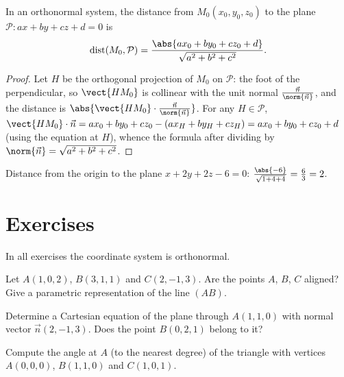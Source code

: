 \begin{proposition}\label{prop:tle:space:distance}
In an orthonormal system, the distance from $M_0(x_0, y_0, z_0)$ to the
plane $\mathcal P : ax + by + cz + d = 0$ is
\[
\operatorname{dist}(M_0, \mathcal P)
= \frac{\abs{ax_0 + by_0 + cz_0 + d}}{\sqrt{a^2 + b^2 + c^2}}.
\]
\end{proposition}

\begin{proof}
Let $H$ be the orthogonal projection of $M_0$ on $\mathcal P$: the foot of
the perpendicular, so $\vect{HM_0}$ is collinear with the unit normal
$\frac{\vec n}{\norm{\vec n}}$, and the distance is
$\abs{\vect{HM_0}\cdot \frac{\vec n}{\norm{\vec n}}}$. For any
$H \in \mathcal P$,
$\vect{HM_0}\cdot\vec n = ax_0 + by_0 + cz_0 - (ax_H + by_H + cz_H)
= ax_0 + by_0 + cz_0 + d$ (using the equation at $H$), whence the formula
after dividing by $\norm{\vec n} = \sqrt{a^2+b^2+c^2}$.
\end{proof}

\begin{example}\label{ex:tle:space:distance}
Distance from the origin to the plane $x + 2y + 2z - 6 = 0$:
$\frac{\abs{-6}}{\sqrt{1 + 4 + 4}} = \frac63 = 2$.
\end{example}

\section{Exercises}

In all exercises the coordinate system is orthonormal.

\begin{exercise}[$\star$]\label{exo:tle:space:1}
Let $A(1, 0, 2)$, $B(3, 1, 1)$ and $C(2, -1, 3)$. Are the points $A$, $B$,
$C$ aligned? Give a parametric representation of the line $(AB)$.
\end{exercise}

\begin{exercise}[$\star$]\label{exo:tle:space:2}
Determine a Cartesian equation of the plane through $A(1, 1, 0)$ with
normal vector $\vec n(2, -1, 3)$. Does the point $B(0, 2, 1)$ belong to it?
\end{exercise}

\begin{exercise}[$\star$]\label{exo:tle:space:3}
Compute the angle at $A$ (to the nearest degree) of the triangle with
vertices $A(0,0,0)$, $B(1, 1, 0)$ and $C(1, 0, 1)$.
\end{exercise}

